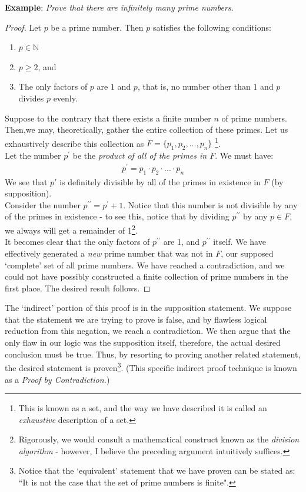 \documentclass[10pt,a4paper,fleqn]{book}
\newcommand{\example}[1]{\textbf{Example}: \emph{#1}}
\let \oldprime \prime
\renewcommand{\prime}{^{\oldprime}}
\newcommand{\dprime}{^{\oldprime\oldprime}}
\begin{document}
	\noindent \example{Prove that there are infinitely many prime numbers.}
	\begin{proof}
		Let $p$ be a prime number. Then $p$ satisfies the following conditions:
			\begin{enumerate}
				\item $p \in \mathbb{N}$
				\item $p \geq 2$, and
				\item The only factors of $p$ are $1$ and $p$, that is, no number other than $1$ and $p$ divides $p$ evenly.
			\end{enumerate}
		Suppose to the contrary that there exists a finite number $n$ of prime numbers. \\
		Then,we may, theoretically, gather the entire collection of these primes. Let us exhaustively describe this collection as $F = \{p_1, p_2, ..., p_n\}$ \footnote{This is known as a set, and the way we have described it is called an \emph{exhaustive} description of a set.}. \\
		Let the number $p\prime$ be the \emph{product of all of the primes in $F$}. We must have:
		\begin{align*}
			p\prime = p_1 \cdot p_2 \cdot ... \cdot p_n
		\end{align*}
		We see that $p'$ is definitely divisible by all of the primes in existence in $F$ (by supposition). \\
		Consider the number $p \dprime = p \prime + 1$. Notice that this number is not divisible by any of the primes in existence - to see this, notice that by dividing $p \dprime $ by any $p \in F$, we always will get a remainder of 1\footnote{Rigorously, we would consult a mathematical construct known as the \emph{division algorithm} - however, I believe the preceding argument intuitively suffices.}.\\

		It becomes clear that the only factors of $p \dprime$ are 1, and $p \dprime$ itself. We have effectively generated a \emph{new} prime number that was not in $F$, our supposed `complete' set of all prime numbers. We have reached a contradiction, and we could not have possibly constructed a finite collection of prime numbers in the first place. The desired result follows.	\end{proof}

	The `indirect' portion of this proof is in the supposition statement. We suppose that the statement we are trying to prove is false, and by flawless logical reduction from this negation, we reach a contradiction. We then argue that the only flaw in our logic was the supposition itself, therefore, the actual desired conclusion must be true. Thus, by resorting to proving another related statement, the desired statement is proven\footnote{Notice that the `equivalent' statement that we have proven can be stated as: ``It is not the case that the set of prime numbers is finite".}. (This specific indirect proof technique is known as a \emph{Proof by Contradiction.})
\end{document}
